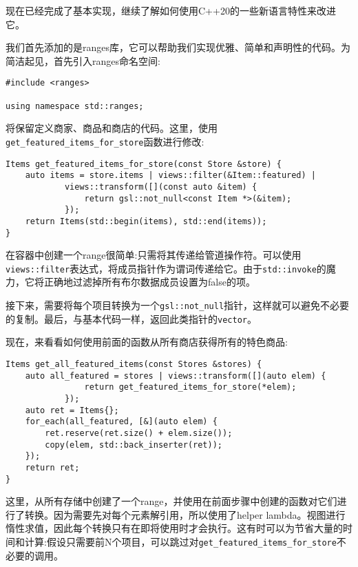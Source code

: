 现在已经完成了基本实现，继续了解如何使用C++20的一些新语言特性来改进它。


我们首先添加的是ranges库，它可以帮助我们实现优雅、简单和声明性的代码。为简洁起见，首先引入ranges命名空间:

\begin{lstlisting}[style=styleCXX]
#include <ranges>

using namespace std::ranges;
\end{lstlisting}

将保留定义商家、商品和商店的代码。这里，使用\texttt{get\_featured\_items\_for\_store}函数进行修改:

\begin{lstlisting}[style=styleCXX]
Items get_featured_items_for_store(const Store &store) {
	auto items = store.items | views::filter(&Item::featured) |
			views::transform([](const auto &item) {
				return gsl::not_null<const Item *>(&item);
			});
	return Items(std::begin(items), std::end(items));
}
\end{lstlisting}

在容器中创建一个range很简单:只需将其传递给管道操作符。可以使用\texttt{views::filter}表达式，将成员指针作为谓词传递给它。由于\texttt{std::invoke}的魔力，它将正确地过滤掉所有布尔数据成员设置为false的项。

接下来，需要将每个项目转换为一个\texttt{gsl::not\_null}指针，这样就可以避免不必要的复制。最后，与基本代码一样，返回此类指针的\texttt{vector}。

现在，来看看如何使用前面的函数从所有商店获得所有的特色商品:

\begin{lstlisting}[style=styleCXX]
Items get_all_featured_items(const Stores &stores) {
	auto all_featured = stores | views::transform([](auto elem) {
				return get_featured_items_for_store(*elem);
			});
	auto ret = Items{};
	for_each(all_featured, [&](auto elem) {
		ret.reserve(ret.size() + elem.size());
		copy(elem, std::back_inserter(ret));
	});
	return ret;
}
\end{lstlisting}

这里，从所有存储中创建了一个range，并使用在前面步骤中创建的函数对它们进行了转换。因为需要先对每个元素解引用，所以使用了helper lambda。视图进行惰性求值，因此每个转换只有在即将使用时才会执行。这有时可以为节省大量的时间和计算:假设只需要前N个项目，可以跳过对\texttt{get\_featured\_items\_for\_store}不必要的调用。

